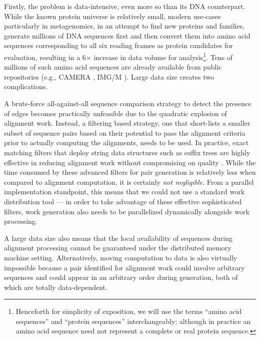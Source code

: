 \documentclass[10pt,journal,letterpaper,compsoc]{IEEEtran}
\begin{document}
Firstly, the problem is data-intensive, even more so than its DNA counterpart. While the known protein universe is relatively small, modern use-cases particularly in metagenomics, in an attempt to find new proteins and families, generate millions of DNA sequences first and then convert them into amino acid sequences corresponding to all six reading frames as protein candidates for evaluation, resulting in a 6$\times$ increase in data volume for analysis\footnote{Henceforth for simplicity of exposition, we will use the terms ``amino acid sequences'' and ``protein sequences'' interchangeably; although in practice an amino acid sequence need not represent a complete or real protein sequence.}. Tens of millions of such amino acid sequences are already available from public repositories (e.g., CAMERA \cite{CAMERA}, IMG/M \cite{IMG08} ). Large data size creates two complications.  
\begin{compactenum}[i)]
\item
 A brute-force all-against-all sequence comparison strategy to detect the presence of edges becomes practically unfeasible due to the quadratic explosion of alignment work. Instead, a filtering based strategy, one that short-lists a smaller subset of sequence pairs based on their potential to pass the alignment criteria prior to actually computing the alignments, needs to be used. In practice, exact matching filters that deploy string data structures such as suffix trees \cite{Weiner73} are highly effective in reducing alignment work without compromising on quality \cite{KalyanaramanNAR03,KalyanaramanJPDC07}. While the time consumed by these advanced filters for pair generation is relatively less when compared to alignment computation, it is certainly \emph{not negligible}. From a parallel implementation standpoint, this means that we could not use a standard work distribution tool --- in order to take advantage of these effective sophisticated filters, work generation also needs to be parallelized dynamically alongside work processing. 
\item
A large data size also means that the local availability of sequences during alignment processing cannot be guaranteed under the distributed memory machine setting. Alternatively, moving computation to data is also virtually impossible because a pair identified for alignment work could involve arbitrary sequences and could appear in an arbitrary order during generation, both of which are totally data-dependent. 
\end{compactenum}
\end{document}
